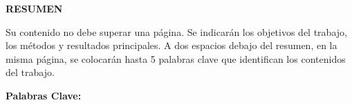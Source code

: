 \begin{centering}
\Large{\textbf{RESUMEN}}

\end{centering}

Su contenido no debe superar una página. Se indicarán los objetivos del trabajo, los métodos y resultados principales. A dos espacios debajo del resumen, en la misma página, se colocarán hasta 5 palabras clave que identifican los contenidos del trabajo.



\textbf{Palabras Clave:} 
